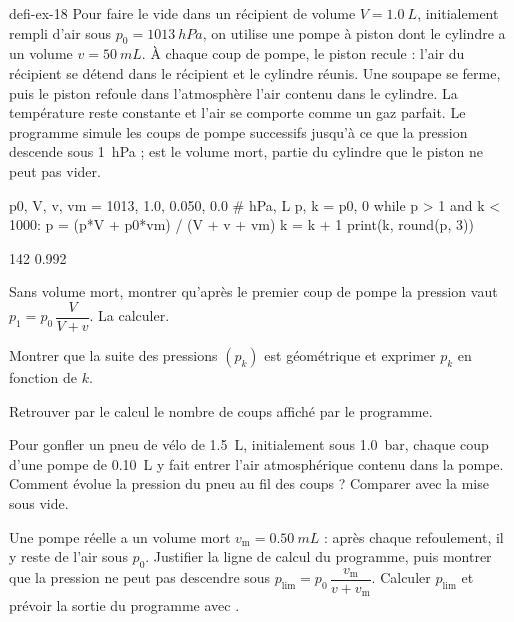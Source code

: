 \begin{blocEdition}{defi-ex-18}
Pour faire le vide dans un récipient de volume $V=\qty{1,0}{L}$, initialement rempli d'air sous $p_0=\qty{1013}{hPa}$, on
utilise une pompe à piston dont le cylindre a un volume $v=\qty{50}{mL}$. À chaque coup de pompe, le piston recule : l'air
du récipient se détend dans le récipient et le cylindre réunis. Une soupape se ferme, puis le piston refoule dans
l'atmosphère l'air contenu dans le cylindre. La température reste constante et l'air se comporte comme un gaz parfait.
Le programme simule les coups de pompe successifs jusqu'à ce que la pression descende sous \qty{1}{hPa} ;  est le
volume mort, partie du cylindre que le piston ne peut pas vider.
\begin{codecote}[0.62]
\begin{pythoncol}
p0, V, v, vm = 1013, 1.0, 0.050, 0.0  # hPa, L
p, k = p0, 0
while p > 1 and k < 1000:
    p = (p*V + p0*vm) / (V + v + vm)
    k = k + 1
print(k, round(p, 3))
\end{pythoncol}
\cote
\begin{consolecol}
142 0.992
\end{consolecol}
\end{codecote}
\par\smallskip
\begin{questions}
\item Sans volume mort, montrer qu'après le premier coup de pompe la pression vaut $p_1=p_0\,\dfrac{V}{V+v}$. La calculer.
\item Montrer que la suite des pressions $(p_k)$ est géométrique et exprimer $p_k$ en fonction de $k$.
\item Retrouver par le calcul le nombre de coups affiché par le programme.
\item Pour gonfler un pneu de vélo de \qty{1,5}{L}, initialement sous \qty{1,0}{bar}, chaque coup d'une pompe de \qty{0,10}{L}
y fait entrer l'air atmosphérique contenu dans la pompe. Comment évolue la pression du pneu au fil des coups ?
Comparer avec la mise sous vide.
\item Une pompe réelle a un volume mort $v_\mathrm{m}=\qty{0,50}{mL}$ : après chaque refoulement, il y reste de l'air sous
$p_0$. Justifier la ligne de calcul du programme, puis montrer que la pression ne peut pas descendre sous
$p_\mathrm{lim}=p_0\,\dfrac{v_\mathrm{m}}{v+v_\mathrm{m}}$. Calculer $p_\mathrm{lim}$ et prévoir la sortie du programme avec
.
\end{questions}
\end{blocEdition}

